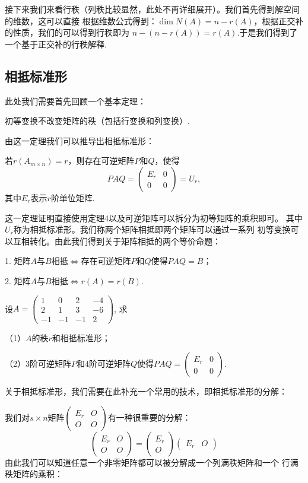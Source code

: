 接下来我们来看行秩（列秩比较显然，此处不再详细展开）。我们首先得到解空间的维数，这可以直接
根据维数公式得到：$\dim N(A)=n-r(A)$，根据正交补的性质，我们的可以得到行秩即为
$n-(n-r(A))=r(A)$.于是我们得到了一个基于正交补的行秩解释.

\subsection{相抵标准形}
此处我们需要首先回顾一个基本定理：
\begin{theorem}
	初等变换不改变矩阵的秩（包括行变换和列变换）.
\end{theorem}
由这一定理我们可以推导出相抵标准形：
\begin{theorem}
	若$r(A_{m \times n})=r$，则存在可逆矩阵$P$和$Q$，使得
	$$PAQ=\begin{pmatrix}
		E_r & 0 \\ 0 & 0
	\end{pmatrix}=U_r,$$
	其中$E_r$表示$r$阶单位矩阵.
\end{theorem}
这一定理证明直接使用定理4以及可逆矩阵可以拆分为初等矩阵的乘积即可。
其中$U_r$称为相抵标准形。我们称两个矩阵相抵即两个矩阵可以通过一系列
初等变换可以互相转化。由此我们得到关于矩阵相抵的两个等价命题：

1. 矩阵$A$与$B$相抵$\iff$存在可逆矩阵$P$和$Q$使得$PAQ=B$；

2. 矩阵$A$与$B$相抵$\iff r(A)=r(B)$.

\begin{example}
	设$A=\begin{pmatrix}
		1 & 0 & 2 & -4 \\ 2 & 1 & 3 & -6 \\ -1 & -1 & -1 & 2
	\end{pmatrix}$, 求

	\textup{（1）}$A$的秩$r$和相抵标准形；

	\textup{（2）}$3$阶可逆矩阵$P$和$4$阶可逆矩阵$Q$使得$PAQ=\begin{pmatrix}
		E_r & 0 \\ 0 & 0
	\end{pmatrix}$.
\end{example}

关于相抵标准形，我们需要在此补充一个常用的技术，即相抵标准形的分解：

我们对$s \times n$矩阵$\begin{pmatrix}
	E_r & O \\ O & O
\end{pmatrix}$有一种很重要的分解：
$$\begin{pmatrix}
	E_r & O \\ O & O
\end{pmatrix}=\begin{pmatrix}
	E_r \\ O
\end{pmatrix}\begin{pmatrix}
	E_r & O
\end{pmatrix}$$ 由此我们可以知道任意一个非零矩阵都可以被分解成一个列满秩矩阵和一个
行满秩矩阵的乘积：

